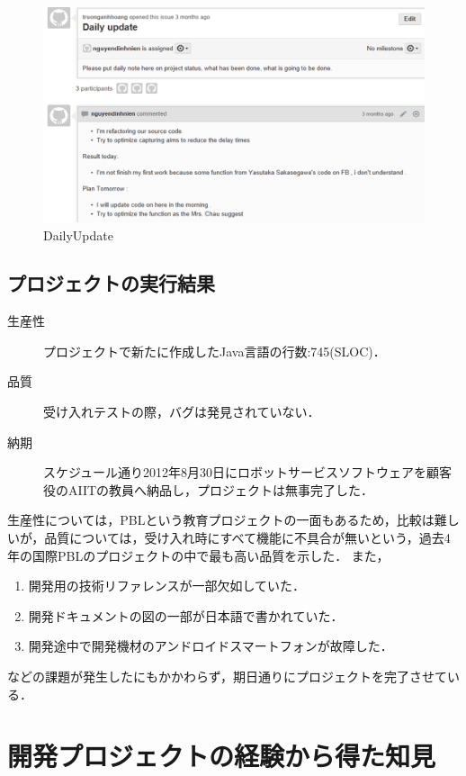 \documentclass[a4j, 12Q, twocolumn, twoside]{jsarticle}
\begin{document}
\begin{figure}[htb]
  \begin{center}
    \includegraphics[width=\columnwidth]{./figures/DailyUPDate.png}
    \caption{DailyUpdate}
    \label{fig:dailyupdate}
  \end{center}
\end{figure}

\subsection{プロジェクトの実行結果}
\begin{description}
 \item[生産性] プロジェクトで新たに作成したJava言語の行数:745(SLOC)．
 \item[品質] 受け入れテストの際，バグは発見されていない．
 \item[納期]スケジュール通り2012年8月30日にロボットサービスソフトウェアを顧客役のAIITの教員へ納品し，プロジェクトは無事完了した．
\end{description}
生産性については，PBLという教育プロジェクトの一面もあるため，比較は難しいが，品質については，受け入れ時にすべて機能に不具合が無いという，過去4年の国際PBLのプロジェクトの中で最も高い品質を示した．
また，
\begin{enumerate}
 \item 開発用の技術リファレンスが一部欠如していた．
 \item 開発ドキュメントの図の一部が日本語で書かれていた．
 \item 開発途中で開発機材のアンドロイドスマートフォンが故障した．
\end{enumerate}
などの課題が発生したにもかかわらず，期日通りにプロジェクトを完了させている．

\section{開発プロジェクトの経験から得た知見}\label{sec:lessonslearned}
\end{document}
